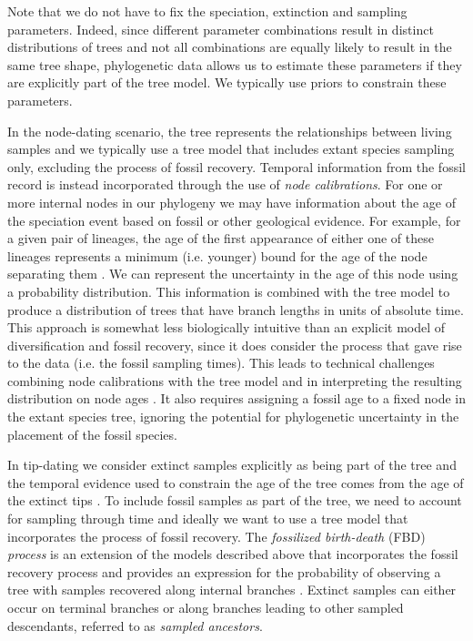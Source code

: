 \documentclass[11pt]{article}
\begin{document}
Note that we do not have to fix the speciation, extinction and sampling parameters. 
Indeed, since different parameter combinations result in distinct distributions of trees and not all combinations are equally likely to result in the same tree shape, phylogenetic data  allows us to estimate these parameters if they are explicitly part of the tree model. 
We typically use priors to constrain these parameters.

In the node-dating scenario, the tree represents the relationships between living samples and we typically use a tree model that includes extant species sampling only, excluding the process of fossil recovery.
Temporal information from the fossil record is instead incorporated through the use of \textit{node calibrations}. 
For one or more internal nodes in our phylogeny we may have information about the age of the speciation event based on fossil or other geological evidence.
For example, for a given pair of lineages, the age of the first appearance of either one of these lineages represents a minimum (i.e. younger) bound for the age of the node separating them \cite{Parham2012}.
We can represent the uncertainty in the age of this node using a probability distribution. %
This information is combined with the tree model to produce a distribution of trees that have branch lengths in units of absolute time.
This approach is somewhat less biologically intuitive than an explicit model of diversification and fossil recovery, since it does consider the process that gave rise to the data (i.e. the fossil sampling times).
This leads to technical challenges combining node calibrations with the tree model and in interpreting the resulting distribution on node ages \cite{Heled2012,Warnock2015}.
It also requires assigning a fossil age to a fixed node in the extant species tree, ignoring the potential for phylogenetic uncertainty in the placement of the fossil species.

In tip-dating we consider extinct samples explicitly as being part of the tree and the temporal evidence used to constrain the age of the tree comes from the age of the extinct tips \cite{Ronquist2012a}.
To include fossil samples as part of the tree, we need to account for sampling through time and ideally we want to use a tree model that incorporates the process of fossil recovery.
The \textit{fossilized birth-death} (FBD) \textit{process} is an extension of the models described above that incorporates the fossil recovery process and provides an expression for the probability of observing a tree with samples recovered along internal branches \cite{Stadler2010,Heath2014,Gavryushkina2014}.
Extinct samples can either occur on terminal branches or along branches leading to other sampled descendants, referred to as \textit{sampled ancestors}.
\end{document}
